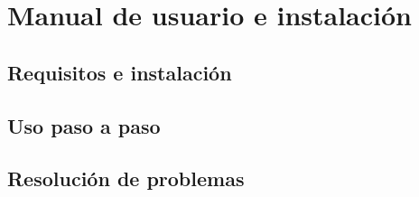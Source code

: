
\chapter{Manual de usuario e instalación}
\label{cha:manual-usuario}

\section{Requisitos e instalación}
\label{sec:man-instalacion}


\section{Uso paso a paso}
\label{sec:man-uso}


\section{Resolución de problemas}
\label{sec:man-problemas}



